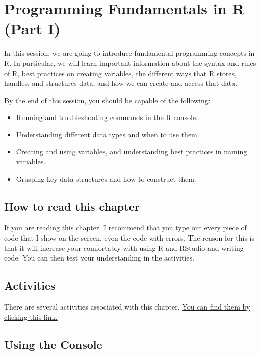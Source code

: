 \documentclass[
]{book}
\providecommand{\tightlist}{%
  \setlength{\itemsep}{0pt}\setlength{\parskip}{0pt}}
\begin{document}
\chapter{\texorpdfstring{\textbf{Programming Fundamentals in R (Part I)}}{Programming Fundamentals in R (Part I)}}\label{programming1}

In this session, we are going to introduce fundamental programming concepts in R. In particular, we will learn important information about the syntax and rules of R, best practices on creating variables, the different ways that R stores, handles, and structures data, and how we can create and access that data.

By the end of this session, you should be capable of the following:

\begin{itemize}
\tightlist
\item
  Running and troubleshooting commands in the R console.
\item
  Understanding different data types and when to use them.
\item
  Creating and using variables, and understanding best practices in naming variables.
\item
  Grasping key data structures and how to construct them.
\end{itemize}

\section{How to read this chapter}\label{how-to-read-this-chapter}

If you are reading this chapter. I recommend that you type out every piece of code that I show on the screen, even the code with errors. The reason for this is that it will increase your comfortably with using R and RStudio and writing code. You can then test your understanding in the activities.

\section{Activities}\label{activities}

There are several activities associated with this chapter. \href{https://ryandonovan.quarto.pub/week-2---activities/}{You can find them by clicking this link.}

\section{Using the Console}\label{using-the-console}
\end{document}
